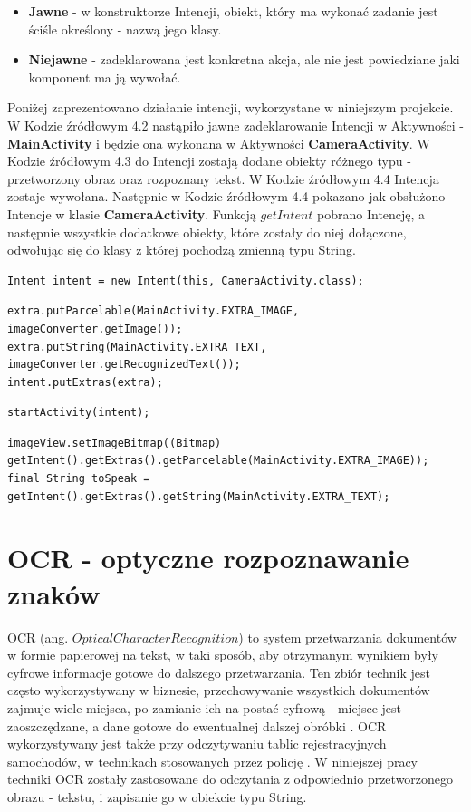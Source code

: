 \documentclass[eng,oneside]{mgr}
\begin{document}
\begin{itemize}
\item \textbf{Jawne} - w konstruktorze Intencji, obiekt, który ma wykonać zadanie jest ściśle określony - nazwą jego klasy.
\item \textbf{Niejawne} - zadeklarowana jest konkretna akcja, ale nie jest powiedziane jaki komponent ma ją wywołać\cite{damianchodorek}.
\end{itemize}
\par Poniżej zaprezentowano działanie intencji, wykorzystane w niniejszym projekcie. W Kodzie źródłowym 4.2 nastąpiło jawne zadeklarowanie Intencji w Aktywności - \textbf{MainActivity} i będzie ona wykonana w Aktywności \textbf{CameraActivity}. W Kodzie źródłowym 4.3 do Intencji zostają dodane obiekty różnego typu - przetworzony obraz oraz rozpoznany tekst. W Kodzie źródłowym 4.4 Intencja zostaje wywołana. Następnie w Kodzie źródłowym 4.4 pokazano jak obsłużono Intencje w klasie \textbf{CameraActivity}. Funkcją $getIntent$ pobrano Intencję, a następnie wszystkie dodatkowe obiekty, które zostały do niej dołączone, odwołując się do klasy z której pochodzą zmienną typu String. 
\begin{lstlisting}[caption={Zadeklarowanie intencji}]
Intent intent = new Intent(this, CameraActivity.class);
\end{lstlisting}
\begin{lstlisting}[caption={Przekazanie obiektów różnego typu w intencji}]
extra.putParcelable(MainActivity.EXTRA_IMAGE, imageConverter.getImage());
extra.putString(MainActivity.EXTRA_TEXT, imageConverter.getRecognizedText());
intent.putExtras(extra);
\end{lstlisting}
\begin{lstlisting}[caption={Wywołanie intencji}]
startActivity(intent);
\end{lstlisting}
\begin{lstlisting}[caption={Obsługa intencji w klasie w którym ma zostać wykonana}]
imageView.setImageBitmap((Bitmap) getIntent().getExtras().getParcelable(MainActivity.EXTRA_IMAGE));
final String toSpeak = getIntent().getExtras().getString(MainActivity.EXTRA_TEXT);
\end{lstlisting}
\section{OCR - optyczne rozpoznawanie znaków}
OCR (ang. $Optical Character Recognition$) to system przetwarzania dokumentów w formie papierowej na tekst, w taki sposób, aby otrzymanym wynikiem były cyfrowe informacje gotowe do dalszego przetwarzania. Ten zbiór technik jest często wykorzystywany w biznesie, przechowywanie wszystkich dokumentów zajmuje wiele miejsca, po zamianie ich na postać cyfrową - miejsce jest zaoszczędzane, a dane gotowe do ewentualnej dalszej obróbki \cite{dokument}. OCR wykorzystywany jest także przy odczytywaniu tablic rejestracyjnych samochodów, w technikach stosowanych przez policję \cite{car}. W niniejszej pracy techniki OCR zostały zastosowane do odczytania z odpowiednio przetworzonego obrazu - tekstu, i zapisanie go w obiekcie typu String.
\end{document}
